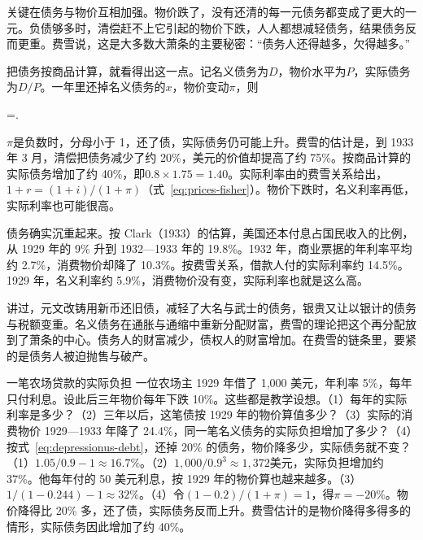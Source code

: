 关键在债务与物价互相加强。物价跌了，没有还清的每一元债务都变成了更大的一元。负债够多时，清偿赶不上它引起的物价下跌，人人都想减轻债务，结果债务反而更重\cite{fisher1933}。费雪说，这是大多数大萧条的主要秘密：“债务人还得越多，欠得越多。”\cite{fisher1933}

把债务按商品计算，就看得出这一点。记名义债务为$D$，物价水平为$P$，实际债务为$D/P$。一年里还掉名义债务的$x$，物价变动$\pi$，则
\begin{keyeq}
=.\label{eq:depressionus-debt}
\end{keyeq}
$\pi$是负数时，分母小于 1，还了债，实际债务仍可能上升。费雪的估计是，到 1933 年 3 月，清偿把债务减少了约 20\%，美元的价值却提高了约 75\%。按商品计算的实际债务增加了约 40\%，即$0.8\times1.75=1.40$\cite{fisher1933}。实际利率由的费雪关系给出，$1+r=(1+i)/(1+\pi)$（式~\eqref{eq:prices-fisher}）。物价下跌时，名义利率再低，实际利率也可能很高。

债务确实沉重起来。按 Clark（1933）的估算，美国还本付息占国民收入的比例，从 1929 年的 9\% 升到 1932—1933 年的 19.8\%\cite{bernanke1983}。1932 年，商业票据的年利率平均约 2.7\%，消费物价却降了 10.3\%\cite{frb1937a,census1975a}。按费雪关系，借款人付的实际利率约 14.5\%。1929 年，名义利率约 5.9\%，消费物价没有变，实际利率也就是这么高\cite{frb1937a,census1975a}。

讲过，元文改铸用新币还旧债，减轻了大名与武士的债务，银贵又让以银计的债务与税额变重。名义债务在通胀与通缩中重新分配财富，费雪的理论把这个再分配放到了萧条的中心。债务人的财富减少，债权人的财富增加。在费雪的链条里，要紧的是债务人被迫抛售与破产。

\begin{example}{一笔农场贷款的实际负担}\label{ex:depressionus-debt}
一位农场主 1929 年借了 1,000 美元，年利率 5\%，每年只付利息。设此后三年物价每年下跌 10\%。这些都是教学设想。（1）每年的实际利率是多少？（2）三年以后，这笔债按 1929 年的物价算值多少？（3）实际的消费物价 1929—1933 年降了 24.4\%，同一笔名义债务的实际负担增加了多少？（4）按式~\eqref{eq:depressionus-debt}，还掉 20\% 的债务，物价降多少，实际债务就不变？
\solution （1）$1.05/0.9-1\approx16.7\%$。（2）$1{,}000/0.9^3\approx1{,}372$美元，实际负担增加约 37\%。他每年付的 50 美元利息，按 1929 年的物价算也越来越多。（3）$1/(1-0.244)-1\approx32\%$。（4）令$(1-0.2)/(1+\pi)=1$，得$\pi=-20\%$。物价降得比 20\% 多，还了债，实际债务反而上升。费雪估计的是物价降得多得多的情形，实际债务因此增加了约 40\%。
\end{example}

